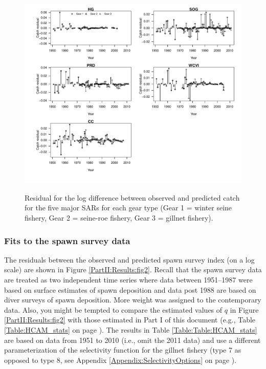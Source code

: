 \begin{figure}[!tbp]
	\includegraphics[width=\textwidth]{../FIGS/qPriorFigs/iscam_fig_catchresid.pdf}\\
	\caption{Residual for the log difference between observed and predicted catch for the five major SARs for each gear type (Gear 1 = winter seine fishery, Gear 2 = seine-roe fishery, Gear 3 = gillnet fishery).}\label{PartII:Results:fig1}
\end{figure}


\subsubsection{Fits to the spawn survey data}
The residuals between the observed and predicted spawn survey index (on a log scale) are shown in Figure \ref{PartII:Results:fig2}.  Recall that the spawn survey data are treated as two independent time series where data between 1951--1987 were based on surface estimates of spawn deposition and data post 1988 are based on diver surveys of spawn deposition.  More weight was assigned to the contemporary data.  Also, you might be tempted to compare the estimated values of $q$ in Figure \ref{PartII:Results:fig2} with those estimated in Part I of this document (e.g., Table \ref{Table:HCAM_stats} on page \pageref{Table:HCAM_stats}).  The results in Table \ref{Table:Table:HCAM_stats} are based on data from 1951 to 2010 (i.e., omit the 2011 data) and use a different parameterization of the selectivity function for the gillnet fishery (type 7 as opposed to type 8, see Appendix \ref{Appendix:SelectivityOptions} on page \pageref{Appendix:SelectivityOptions}).

